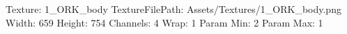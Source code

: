 Texture: 1_ORK_body
TextureFilePath: Assets/Textures/1_ORK_body.png
Width: 659
Height: 754
Channels: 4
Wrap: 1
Param Min: 2
Param Max: 1